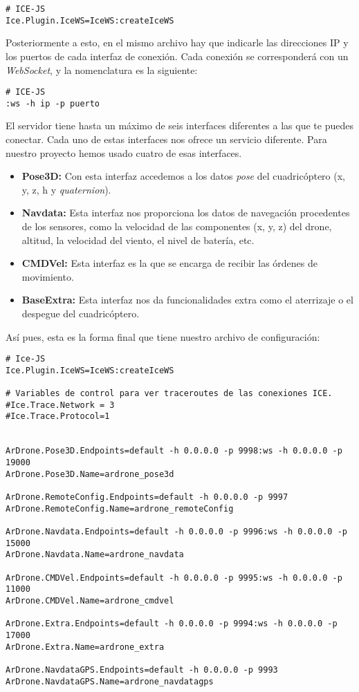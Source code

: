 \begin{lstlisting}[caption=Activación del plugin ICEJS]
# ICE-JS
Ice.Plugin.IceWS=IceWS:createIceWS
\end{lstlisting}

Posteriormente a esto, en el mismo archivo hay que indicarle las direcciones IP y los puertos de cada interfaz de conexión. Cada conexión se corresponderá con un \emph{WebSocket}, y la nomenclatura es la siguiente:\\

\begin{lstlisting}[caption=Formato \emph{endpoints} de los \emph{WebSocket} de ICEJS]
# ICE-JS
:ws -h ip -p puerto
\end{lstlisting}


El servidor tiene hasta un máximo de seis interfaces diferentes a las que te puedes conectar. Cada uno de estas interfaces nos ofrece un servicio diferente. Para nuestro proyecto hemos usado cuatro de esas interfaces.

\begin{itemize}
\item \textbf{Pose3D:} Con esta interfaz accedemos a los datos \emph{pose} del cuadricóptero (x, y, z, h y \emph{quaternion}).
\item \textbf{Navdata:} Esta interfaz nos proporciona los datos de navegación procedentes de los sensores, como la velocidad de las componentes (x, y, z) del drone, altitud, la velocidad del viento, el nivel de batería, etc.
\item \textbf{CMDVel:} Esta interfaz es la que se encarga de recibir las órdenes de movimiento.
\item \textbf{BaseExtra:} Esta interfaz nos da funcionalidades extra como el aterrizaje o el despegue del cuadricóptero.
\end{itemize}

Así pues, esta es la forma final que tiene nuestro archivo de configuración:\\

\begin{lstlisting}[caption=Archivo de configuración]
# Ice-JS
Ice.Plugin.IceWS=IceWS:createIceWS

# Variables de control para ver traceroutes de las conexiones ICE.
#Ice.Trace.Network = 3
#Ice.Trace.Protocol=1


ArDrone.Pose3D.Endpoints=default -h 0.0.0.0 -p 9998:ws -h 0.0.0.0 -p 19000
ArDrone.Pose3D.Name=ardrone_pose3d

ArDrone.RemoteConfig.Endpoints=default -h 0.0.0.0 -p 9997
ArDrone.RemoteConfig.Name=ardrone_remoteConfig

ArDrone.Navdata.Endpoints=default -h 0.0.0.0 -p 9996:ws -h 0.0.0.0 -p 15000
ArDrone.Navdata.Name=ardrone_navdata

ArDrone.CMDVel.Endpoints=default -h 0.0.0.0 -p 9995:ws -h 0.0.0.0 -p 11000
ArDrone.CMDVel.Name=ardrone_cmdvel

ArDrone.Extra.Endpoints=default -h 0.0.0.0 -p 9994:ws -h 0.0.0.0 -p 17000
ArDrone.Extra.Name=ardrone_extra

ArDrone.NavdataGPS.Endpoints=default -h 0.0.0.0 -p 9993
ArDrone.NavdataGPS.Name=ardrone_navdatagps
\end{lstlisting}

